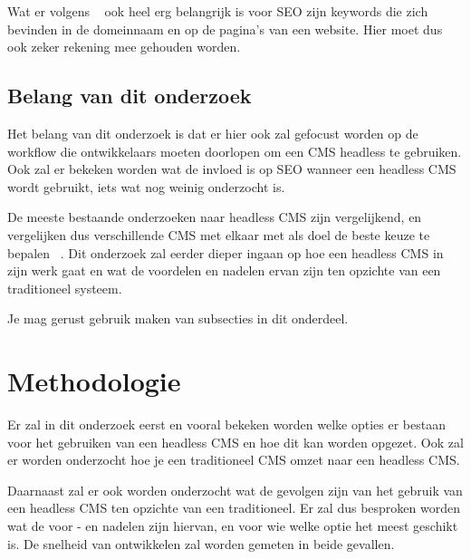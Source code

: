 Wat er volgens ~\autocite{Shreves2012} ook heel erg belangrijk is voor SEO zijn keywords die zich bevinden in de domeinnaam en op de pagina's van een website. Hier moet dus ook zeker rekening mee gehouden worden.

\subsection{Belang van dit onderzoek}
Het belang van dit onderzoek is dat er hier ook zal gefocust worden op de workflow die ontwikkelaars moeten doorlopen om een CMS headless te gebruiken. Ook zal er bekeken worden wat de invloed is op SEO wanneer een headless CMS wordt gebruikt, iets wat nog weinig onderzocht is. 

De meeste bestaande onderzoeken naar headless CMS zijn vergelijkend, en vergelijken dus verschillende CMS met elkaar met als doel de beste keuze te bepalen ~\autocite{Barker2018}. Dit onderzoek zal eerder dieper ingaan op hoe een headless CMS in zijn werk gaat en wat de voordelen en nadelen ervan zijn ten opzichte van een traditioneel systeem.


Je mag gerust gebruik maken van subsecties in dit onderdeel.

\section{Methodologie}
\label{sec:methodologie}

Er zal in dit onderzoek eerst en vooral bekeken worden welke opties er bestaan voor het gebruiken van een headless CMS en hoe dit kan worden opgezet. Ook zal er worden onderzocht hoe je een traditioneel CMS omzet naar een headless CMS.

Daarnaast zal er ook worden onderzocht wat de gevolgen zijn van het gebruik van een headless CMS ten opzichte van een traditioneel. Er zal dus besproken worden wat de voor - en nadelen zijn hiervan, en voor wie welke optie het meest geschikt is. De snelheid van ontwikkelen zal worden gemeten in beide gevallen.

